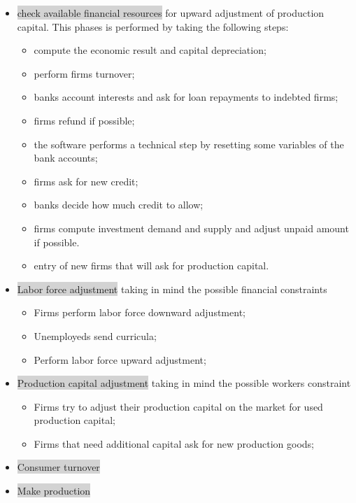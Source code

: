 \documentclass{book}
\begin{document}
\begin{itemize}
	\item \colorbox{lightgray}{check available financial resources} for upward adjustment of production capital. This phases is performed by taking the following steps:

\begin{itemize}
	\item compute the economic result and capital depreciation;
	\item perform firms turnover;
	\item banks account interests and ask for loan repayments to indebted firms;
	\item firms refund if possible;
	\item the software performs a technical step by resetting some variables of the bank accounts;
	\item firms ask for new credit;
	\item banks decide how much credit to allow;
	\item firms compute investment demand and supply and adjust unpaid amount if possible.
	\item entry of new firms that will ask for production capital.
\end{itemize}


	\item \colorbox{lightgray}{Labor force adjustment} taking in mind the possible financial constraints
		\begin{itemize}
			\item Firms perform labor force downward adjustment;
			\item Unemployeds send curricula;
			\item Perform labor force upward adjustment; 
		\end{itemize}
	\item \colorbox{lightgray}{Production capital adjustment} taking in mind the possible workers constraint
		\begin{itemize}
			\item Firms try to adjust their production capital on the market for used production capital;
			\item Firms that need additional capital ask for new production goods;
		\end{itemize}
	\item \colorbox{lightgray}{Consumer turnover}
	\item \colorbox{lightgray}{Make production}
\end{itemize}
\end{document}
